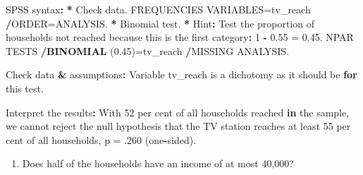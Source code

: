 \documentclass[a4paper]{book}
\newenvironment{Shaded}{\begin{snugshade}}{\end{snugshade}}
\newcommand{\KeywordTok}[1]{\textcolor[rgb]{0,0,0}{\textbf{#1}}}
\newcommand{\DecValTok}[1]{\textcolor[rgb]{0.00,0.00,0.00}{#1}}
\newcommand{\FloatTok}[1]{\textcolor[rgb]{0.00,0.00,0.00}{#1}}
\newcommand{\StringTok}[1]{\textcolor[rgb]{0.00,0.00,0.00}{#1}}
\newcommand{\ControlFlowTok}[1]{\textcolor[rgb]{0.00,0.00,0.00}{\textbf{#1}}}
\newcommand{\OperatorTok}[1]{\textcolor[rgb]{0.00,0.00,0.00}{\textbf{#1}}}
\newcommand{\ErrorTok}[1]{\textcolor[rgb]{0.00,0.00,0.00}{\textbf{#1}}}
\newcommand{\NormalTok}[1]{#1}
\providecommand{\tightlist}{%
  \setlength{\itemsep}{0pt}\setlength{\parskip}{0pt}}
\theoremstyle{definition}
\theoremstyle{definition}
\theoremstyle{definition}
\theoremstyle{remark}
\begin{document}
\begin{Shaded}
\begin{Highlighting}[]
\NormalTok{SPSS syntax}\OperatorTok{:}\StringTok{  }
\StringTok{  }
\ErrorTok{*}\StringTok{ }\NormalTok{Check data.  }
\NormalTok{FREQUENCIES VARIABLES=tv_reach  }
  \OperatorTok{/}\NormalTok{ORDER=ANALYSIS.  }
\OperatorTok{*}\StringTok{ }\NormalTok{Binomial test.  }
\OperatorTok{*}\StringTok{ }\NormalTok{Hint}\OperatorTok{:}\StringTok{ }\NormalTok{Test the proportion of households not reached because   }
\NormalTok{  this is the first category}\OperatorTok{:}\StringTok{ }\DecValTok{1} \OperatorTok{-}\StringTok{ }\FloatTok{0.55}\NormalTok{ =}\StringTok{ }\FloatTok{0.45}\NormalTok{.  }
\NormalTok{NPAR TESTS  }
  \OperatorTok{/}\KeywordTok{BINOMIAL}\NormalTok{ (}\FloatTok{0.45}\NormalTok{)=tv_reach  }
  \OperatorTok{/}\NormalTok{MISSING ANALYSIS.  }
  
\NormalTok{Check data }\OperatorTok{&}\StringTok{ }\NormalTok{assumptions}\OperatorTok{:}\StringTok{   }
\StringTok{  }
\NormalTok{Variable tv_reach is a dichotomy as it should be }\ControlFlowTok{for}\NormalTok{ this test.  }
    
\NormalTok{Interpret the results}\OperatorTok{:}\StringTok{  }
\StringTok{  }
\NormalTok{With }\DecValTok{52}\NormalTok{ per cent of all households reached }\ControlFlowTok{in}\NormalTok{ the sample, we cannot reject the}
\NormalTok{null hypothesis that the TV station reaches at least }\DecValTok{55}\NormalTok{ per cent of all}
\NormalTok{households, p =}\StringTok{ }\NormalTok{.}\DecValTok{260}\NormalTok{ (one}\OperatorTok{-}\NormalTok{sided).}
\end{Highlighting}
\end{Shaded}

\begin{enumerate}
\def\labelenumi{\arabic{enumi}.}
\setcounter{enumi}{2}
\tightlist
\item
  Does half of the households have an income of at most 40,000?
\end{enumerate}
\end{document}
